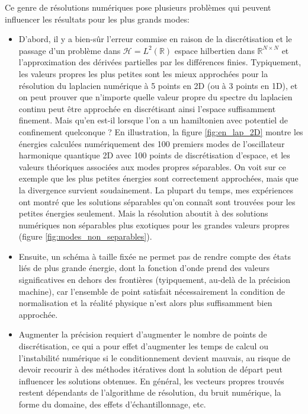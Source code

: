 \documentclass[svgnames,dvipsnames,a4paper,10pt,french]{report}
\begin{document}
Ce genre de résolutions numériques pose plusieurs problèmes qui peuvent influencer les résultats pour les plus grands modes:
\begin{itemize}
    \item D'abord, il y a bien-sûr l'erreur commise en raison de la discrétisation et le passage d'un problème dans $\mathcal{H}=L^2(\mathbb{R})$ espace hilbertien dans $\mathbb{R}^{N\times N}$ et  l'approximation des dérivées partielles par les différences finies. Typiquement, les valeurs propres les plus petites sont les mieux approchées pour la résolution du laplacien numérique à 5 points en 2D (ou à 3 points en 1D), et on peut prouver que n'importe quelle valeur propre du spectre du laplacien continu peut être approchée en discrétisant ainsi l'espace suffisamment finement. Mais qu'en est-il lorsque l'on a un hamiltonien  avec potentiel de confinement quelconque ? En illustration, la figure  \ref{fig:en_lap_2D} montre les énergies calculées numériquement des 100 premiers modes de l'oscillateur harmonique quantique 2D avec 100 points de discrétisation d'espace, et les valeurs théoriques associées aux modes propres séparables. On voit sur ce exemple que les plus petites énergies sont correctement approchées, mais que la divergence survient soudainement. La plupart du temps, mes expériences ont montré que les solutions séparables qu'on connaît sont trouvées pour les petites énergies seulement.  Mais la résolution aboutit à des solutions numériques non séparables plus \og exotiques \fg{} pour les grandes valeurs propres (figure \ref{fig:modes_non_separables}).

    \item Ensuite, un schéma à taille fixée ne permet pas de rendre compte des états liés de plus grande énergie, dont la fonction d'onde prend des valeurs significatives en dehors des frontières (tyipquement, au-delà de la précision machine), car l'ensemble de point satisfait nécessairement la condition de normalisation et la réalité physique n'est alors plus suffisamment bien approchée.
    
    
    \item Augmenter la précision requiert d'augmenter le nombre de points de discrétisation, ce qui a pour effet d'augmenter les temps de calcul ou l'instabilité numérique si le conditionnement devient mauvais, au risque de devoir recourir à des méthodes itératives dont la solution de départ peut influencer les solutions obtenues. En général, les vecteurs propres trouvés restent dépendants de l'algorithme de résolution, du bruit numérique, la forme du domaine, des effets d'échantillonnage, etc.
\end{itemize}
\end{document}
